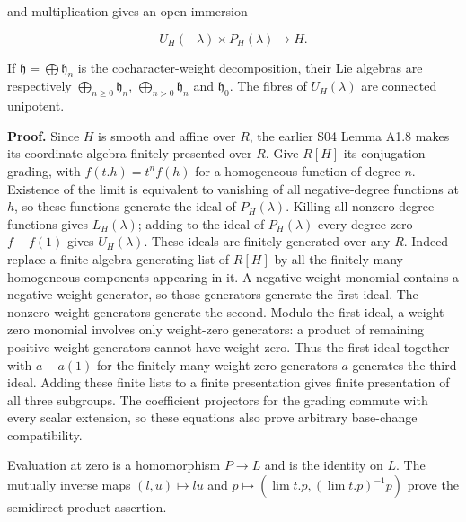 \documentclass[11pt,a4paper,openany]{report}
\begin{document}
and multiplication gives an open immersion

\[
U_H(-\lambda)\times P_H(\lambda)\longrightarrow H.
\]

If \(\mathfrak h=\bigoplus\mathfrak h_n\) is the cocharacter-weight decomposition, their Lie algebras are respectively \(\bigoplus_{n\ge0}\mathfrak h_n\), \(\bigoplus_{n>0}\mathfrak h_n\) and \(\mathfrak h_0\). The fibres of \(U_H(\lambda)\) are connected unipotent.

\textbf{Proof.} Since \(H\) is smooth and affine over \(R\), the earlier S04 Lemma A1.8 makes its coordinate algebra finitely presented over \(R\). Give \(R[H]\) its conjugation grading, with \(f(t.h)=t^n f(h)\) for a homogeneous function of degree \(n\). Existence of the limit is equivalent to vanishing of all negative-degree functions at \(h\), so these functions generate the ideal of \(P_H(\lambda)\). Killing all nonzero-degree functions gives \(L_H(\lambda)\); adding to the ideal of \(P_H(\lambda)\) every degree-zero \(f-f(1)\) gives \(U_H(\lambda)\). These ideals are finitely generated over any \(R\). Indeed replace a finite algebra generating list of \(R[H]\) by all the finitely many homogeneous components appearing in it. A negative-weight monomial contains a negative-weight generator, so those generators generate the first ideal. The nonzero-weight generators generate the second. Modulo the first ideal, a weight-zero monomial involves only weight-zero generators: a product of remaining positive-weight generators cannot have weight zero. Thus the first ideal together with \(a-a(1)\) for the finitely many weight-zero generators \(a\) generates the third ideal. Adding these finite lists to a finite presentation gives finite presentation of all three subgroups. The coefficient projectors for the grading commute with every scalar extension, so these equations also prove arbitrary base-change compatibility.

Evaluation at zero is a homomorphism \(P\to L\) and is the identity on \(L\). The mutually inverse maps \((l,u)\mapsto lu\) and \(p\mapsto(\lim t.p,(\lim t.p)^{-1}p)\) prove the semidirect product assertion.
\end{document}
